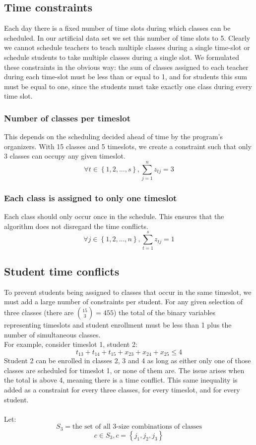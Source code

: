 \documentclass[11pt]{article}
\begin{document}
\subsection{Time constraints}
Each day there is a fixed number of time slots during which classes can be scheduled. In our artificial data set we set this number of time slots to 5. Clearly we cannot schedule teachers to teach multiple classes during a single time-slot or schedule students to take multiple classes during a single slot. We formulated these constraints in the obvious way: the sum of classes assigned to each teacher during each time-slot must be less than or equal to 1, and for students this sum must be equal to one, since the students must take exactly one class during every time slot.\\
\subsubsection{Number of classes per timeslot}
This depends on the scheduling decided ahead of time by the program's organizers. With 15 classes and 5 timeslots, we create a constraint such that only 3 classes can occupy any given timeslot.
\[\forall t \in \left\{ {1,2,...,s}\right\}, \sum_{j=1}^{n}z_{tj} = 3\]
\subsubsection{Each class is assigned to only one timeslot}
Each class should only occur once in the schedule. This ensures that the algorithm does not disregard the time conflicts.
\[\forall j \in \left\{ {1,2,...,n}\right\}, \sum_{t=1}^{s}z_{tj} = 1\]
\subsection{Student time conflicts}
To prevent students being assigned to classes that occur in the same timeslot, we must add a large number of constraints per student. For any given selection of three classes (there are $\binom {15}{3} = 455$) the total of the binary variables representing timeslots and student enrollment must be less than 1 plus the number of simultaneous classes.\\ 
\indent For example, consider timeslot 1, student 2:\\
\[t_{13}+t_{14}+t_{15}+x_{23} +x_{24} +x_{25} \leq 4 \]
Student 2 can be enrolled in classes 2, 3 and 4 as long as either only one of those classes are scheduled for timeslot 1, or none of them are. The issue arises when the total is above 4, meaning there is a time conflict. This same inequality is added as a constraint for every three classes, for every timeslot, and for every student.\\\\
\indent Let:
\[S_3 = \text{the set of all 3-size combinations of classes}\]
\[c \in S_3, c = \left\{ {j_1, j_2, j_3}\right\}\]
\end{document}
